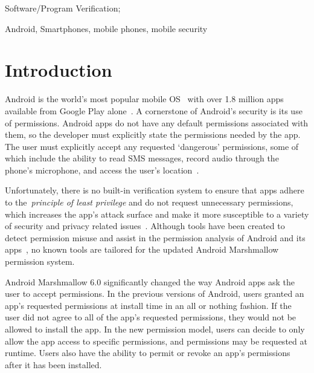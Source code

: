 \documentclass{sig-alternate-05-2015}
\begin{document}




Software/Program Verification;

\begin{keywords}
Android, Smartphones, mobile phones, mobile security
\end{keywords}


\section{Introduction}

Android is the world's most popular mobile OS~\cite{OSMarketShare_URL} with over 1.8 million apps available from Google Play alone~\cite{statistica_url}. A cornerstone of Android's security is its use of permissions. Android apps do not have any default permissions associated with them, so the developer must explicitly state the permissions needed by the app. The user must explicitly accept any requested `dangerous' permissions, some of which include the ability to read SMS messages, record audio through the phone's microphone, and access the user's location~\cite{AndroidSystemPermissions_URL}.

Unfortunately, there is no built-in verification system to ensure that apps adhere to the~\emph{principle of least privilege} and do not request unnecessary permissions, which increases the app's attack surface and make it more susceptible to a variety of security and privacy related issues~\cite{johnson2012analysis}. Although tools have been created to detect permission misuse and assist in the permission analysis of Android and its apps~\cite{Au:2012:PAA:2382196.2382222, Felt:2011:APD:2046707.2046779}, no known tools are tailored for the updated Android Marshmallow permission system.

Android Marshmallow 6.0 significantly changed the way Android apps ask the user to accept permissions. In the previous versions of Android, users granted an app's requested permissions at install time in an all or nothing fashion. If the user did not agree to all of the app's requested permissions, they would not be allowed to install the app. In the new permission model, users can decide to only allow the app access to specific permissions, and permissions may be requested at runtime. Users also have the ability to permit or revoke an app's permissions after it has been installed.
\end{document}
